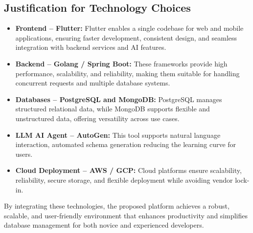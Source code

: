 \subsection{Justification for Technology Choices}

\begin{itemize}
    \item \textbf{Frontend -- Flutter:} Flutter enables a single codebase for web and mobile applications, ensuring faster development, consistent design, and seamless integration with backend services and AI features.
    
    \item \textbf{Backend -- Golang / Spring Boot:} These frameworks provide high performance, scalability, and reliability, making them suitable for handling concurrent requests and multiple database systems.
    
    \item \textbf{Databases -- PostgreSQL and MongoDB:} PostgreSQL manages structured relational data, while MongoDB supports flexible and unstructured data, offering versatility across use cases.
    
    \item \textbf{LLM AI Agent -- AutoGen:} This tool supports natural language interaction, automated schema generation reducing the learning curve for users.

    
    \item \textbf{Cloud Deployment -- AWS / GCP:} Cloud platforms ensure scalability, reliability, secure storage, and flexible deployment while avoiding vendor lock-in.
\end{itemize}

By integrating these technologies, the proposed platform achieves a robust, scalable, and user-friendly environment that enhances productivity and simplifies database management for both novice and experienced developers.
